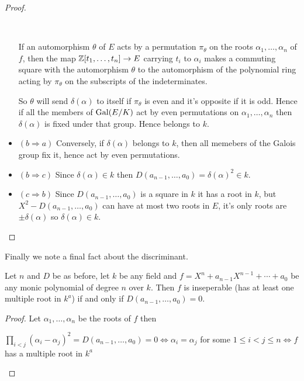 \begin{bergman}
\begin{proof}
\begin{itemize}
    \

    If an automorphism $\theta$ of $E$ acts by a permutation $\pi_\theta$ on the roots $\alpha_1,\ldots,\alpha_n$ of $f$, then the map $\mathbb{Z}[t_1,\ldots,t_n] \rightarrow E$ carrying $t_i$ to $\alpha_i$ makes a commuting square with the automorphism $\theta$ to the automorphism of the polynomial ring acting by $\pi_\theta$ on the subscripts of the indeterminates. 

    So $\theta$ will send $\delta(\alpha)$ to itself if $\pi_\theta$ is even and it's opposite if it is odd. Hence if all the members of $\text{Gal}(E/K)$ act by even permutations on $\alpha_1,\ldots,\alpha_n$ then $\delta(\alpha)$ is fixed under that group. Hence belongs to $k$. 
    \item $(b\Rightarrow a)$ Conversely, if $\delta(\alpha)$ belongs to $k$, then all memebers of the Galois group fix it, hence act by even permutations.
    \item $(b\Rightarrow c)$ Since $\delta(\alpha)\in k$ then $D(a_{n-1},\ldots,a_0) = {\delta(\alpha)}^2\in k$.
    \item $(c\Rightarrow b)$ Since $D(a_{n-1},\ldots,a_0)$ is a square in $k$ it has a root in $k$, but $X^2 - D(a_{n-1},\ldots,a_0)$ can have at most two roots in $E$, it's only roots are $\pm \delta(\alpha)$ so $\delta(\alpha)\in k$.
  \end{itemize}
\end{proof}
Finally we note a final fact about the discriminant.\begin{lemma}
  Let $n$ and $D$ be as before, let $k$ be any field and $f = X^n+a_{n-1}X^{n-1}+\cdots+a_0$ be any monic polynomial of degree $n$ over $k$. Then $f$ is inseperable (has at least one multiple root in $k^a$) if and only if $D(a_{n-1},\ldots,a_0) = 0$.
\end{lemma}
\begin{proof}
  Let $\alpha_1,\ldots,\alpha_n$ be the roots of $f$ then \begin{center}$\prod_{i<j}{(\alpha_i-\alpha_j)}^2 = D(a_{n-1},\ldots,a_0) = 0 \iff \alpha_i=\alpha_j$ for some $1\leq i<j\leq n \iff f$ has a multiple root in $k^a$\end{center}
\end{proof}
\end{bergman}
